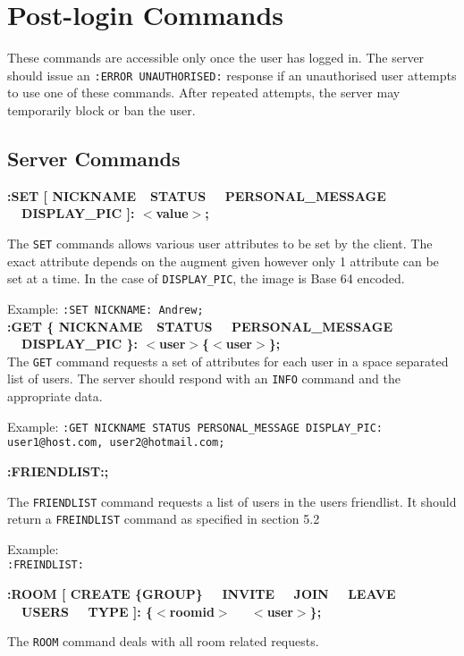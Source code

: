 \section{Post-login Commands}

These commands are accessible only once the user has logged in. The server should issue an \texttt{:ERROR UNAUTHORISED:} response if an unauthorised user attempts to use one of these commands. After repeated attempts, the server may temporarily block or ban the user.

\subsection{Server Commands}

{\bf :SET [ NICKNAME\ \vline \ STATUS \ \vline \ PERSONAL\_MESSAGE \ \vline \ DISPLAY\_PIC ]: $<$value$>$;}

The \texttt{SET} commands allows various user attributes to be set by the client. The exact attribute depends on the augment given however only 1 attribute can be set at a time. In the case of \texttt{DISPLAY\_PIC}, the image is Base 64 encoded.

Example:
\texttt{:SET NICKNAME: Andrew;} \\

{\bf :GET \{ NICKNAME\ \vline \ STATUS \ \vline \ PERSONAL\_MESSAGE \ \vline \ DISPLAY\_PIC \}: $<$user$>$\{$<$user$>$\};} \\

The \texttt{GET} command requests a set of attributes for each user in a space separated list of users. The server should respond with an \texttt{INFO} command and the appropriate data.

Example:
\texttt{:GET NICKNAME STATUS PERSONAL\_MESSAGE DISPLAY\_PIC: user1@host.com, user2@hotmail.com;}

{\bf :FRIENDLIST:;}

The \texttt{FRIENDLIST} command requests a list of users in the users friendlist. It should return a \texttt{FREINDLIST} command as specified in section 5.2

Example: \\
\texttt{:FREINDLIST:} 
	
{\bf :ROOM [ CREATE \{GROUP\} \ \vline \ INVITE \ \vline \ JOIN \ \vline \ LEAVE \ \vline \ USERS \ \vline \ TYPE ]: \{$<$roomid$>$ \ \vline \ $<$user$>$\};}

The \texttt{ROOM} command deals with all room related requests.

